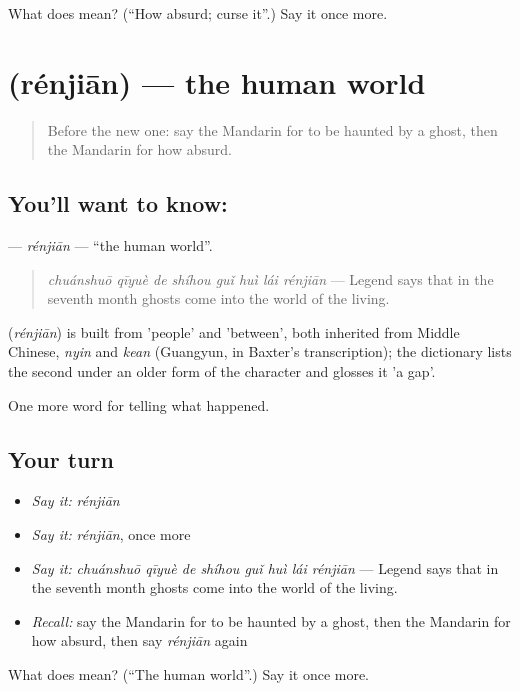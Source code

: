 \begin{tcolorbox}[breakable,colback=teal!4,colframe=teal!35!black,title={Before you move on}]
What does  mean? (\textquotedblleft{}How absurd; curse it\textquotedblright{}.) Say it once more.
\end{tcolorbox}
\section[\texorpdfstring{\zh{人间} (rénjiān)}{人间 (rénjiān)}]{ (rénjiān) — the human world}

\label{lesson:ZH-C332-renjian}



\begin{quote}
Before the new one: say the Mandarin for to be haunted by a ghost, then the Mandarin for how absurd.
\end{quote}

\subsection*{You'll want to know: }
\textbf{} — \emph{rénjiān} — \textquotedblleft{}the human world\textquotedblright{}.

\begin{quote}
\textbf{} \emph{chuánshuō qīyuè de shíhou guǐ huì lái rénjiān} — Legend says that in the seventh month ghosts come into the world of the living.
\end{quote}

\begin{cousinweb}
\textbf{} (\emph{rénjiān}) is built from  'people' and  'between', both inherited from Middle Chinese, \emph{nyin} and \emph{kean} (Guangyun, in Baxter's transcription); the dictionary lists the second under an older form of the character and glosses it 'a gap'.
\end{cousinweb}

\begin{grammarlens}[title={What you've built}]
One more word for telling what happened.
\end{grammarlens}

\subsection*{Your turn}
\begin{itemize}
\raggedright
  \item \emph{Say it:} \emph{rénjiān}
  \item \emph{Say it:} \emph{rénjiān}, once more
  \item \emph{Say it:} \emph{chuánshuō qīyuè de shíhou guǐ huì lái rénjiān} — Legend says that in the seventh month ghosts come into the world of the living.
  \item \emph{Recall:} say the Mandarin for to be haunted by a ghost, then the Mandarin for how absurd, then say \emph{rénjiān} again
\end{itemize}

\begin{tcolorbox}[breakable,colback=teal!4,colframe=teal!35!black,title={Before you move on}]
What does  mean? (\textquotedblleft{}The human world\textquotedblright{}.) Say it once more.
\end{tcolorbox}
